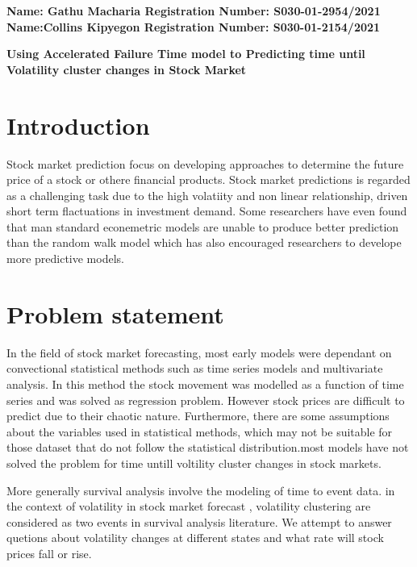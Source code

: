 \documentclass[twoside,a4paper,12pt]{article}
\begin{document}
	
	\begin{flushleft} 
			\large{\bf{Name: Gathu Macharia     Registration Number: S030-01-2954/2021\\
					   Name:Collins Kipyegon        Registration Number: S030-01-2154/2021\\}} \vspace*{0.75in}
	\end{flushleft}
	
	\begin{center} \Large{ \bf{Using Accelerated Failure Time model to Predicting  time until Volatility cluster changes in Stock Market}} \end{center}	


\section*{Introduction} Stock market prediction focus on developing approaches to determine the future price of a stock or othere financial products. Stock market predictions is regarded as a challenging task due to the high volatiity and non linear relationship, driven short term flactuations in investment demand. Some researchers have even found that man standard econemetric models are unable to produce better prediction than the random walk model which has also encouraged researchers to develope more predictive models.



\section*{Problem statement}In the field of stock market forecasting, most early models were dependant on convectional statistical methods such as time series models and multivariate analysis.  In this method the stock movement was modelled as a function of time series and was solved as regression problem. However stock prices are difficult to predict due to their chaotic nature. Furthermore, there are some assumptions about the variables used in statistical methods, which may not be suitable for those dataset that do not follow the statistical distribution.most models have not  solved the problem for time untill voltility cluster changes in stock markets.

More generally survival analysis involve the modeling of time to event data. in the context of volatility in stock market forecast , volatility clustering are considered as two events in survival analysis literature. We attempt to answer quetions about volatility changes at different states and what rate will stock prices fall or rise.
\end{document}

